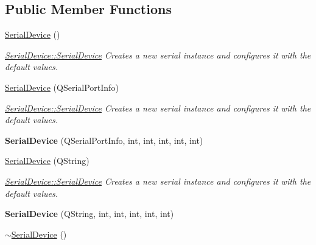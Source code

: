 \subsection*{Public Member Functions}
\begin{DoxyCompactItemize}
\item 
\hypertarget{class_serial_device_aad126bede3b0adf49e1fbe3afd7c6c42}{}\label{class_serial_device_aad126bede3b0adf49e1fbe3afd7c6c42} 
\hyperlink{class_serial_device_aad126bede3b0adf49e1fbe3afd7c6c42}{Serial\+Device} ()
\begin{DoxyCompactList}\small\item\em \hyperlink{class_serial_device_aad126bede3b0adf49e1fbe3afd7c6c42}{Serial\+Device\+::\+Serial\+Device} Creates a new serial instance and configures it with the default values. \end{DoxyCompactList}\item 
\hyperlink{class_serial_device_aa0b6d87aea8d882096abe85fda113b26}{Serial\+Device} (Q\+Serial\+Port\+Info)
\begin{DoxyCompactList}\small\item\em \hyperlink{class_serial_device_aad126bede3b0adf49e1fbe3afd7c6c42}{Serial\+Device\+::\+Serial\+Device} Creates a new serial instance and configures it with the default values. \end{DoxyCompactList}\item 
\hypertarget{class_serial_device_acd6d42b1547bef45569e20ba75cd024a}{}\label{class_serial_device_acd6d42b1547bef45569e20ba75cd024a} 
{\bfseries Serial\+Device} (Q\+Serial\+Port\+Info, int, int, int, int, int)
\item 
\hyperlink{class_serial_device_a070f0759c102570004f1c5e1feb31abe}{Serial\+Device} (Q\+String)
\begin{DoxyCompactList}\small\item\em \hyperlink{class_serial_device_aad126bede3b0adf49e1fbe3afd7c6c42}{Serial\+Device\+::\+Serial\+Device} Creates a new serial instance and configures it with the default values. \end{DoxyCompactList}\item 
\hypertarget{class_serial_device_ade7e1d81fe4768ca9f04b12513d7e316}{}\label{class_serial_device_ade7e1d81fe4768ca9f04b12513d7e316} 
{\bfseries Serial\+Device} (Q\+String, int, int, int, int, int)
\item 
\hypertarget{class_serial_device_abd30865bc9e855e8be713f666d6b4244}{}\label{class_serial_device_abd30865bc9e855e8be713f666d6b4244} 
\hyperlink{class_serial_device_abd30865bc9e855e8be713f666d6b4244}{$\sim$\+Serial\+Device} ()

\end{DoxyCompactItemize}
